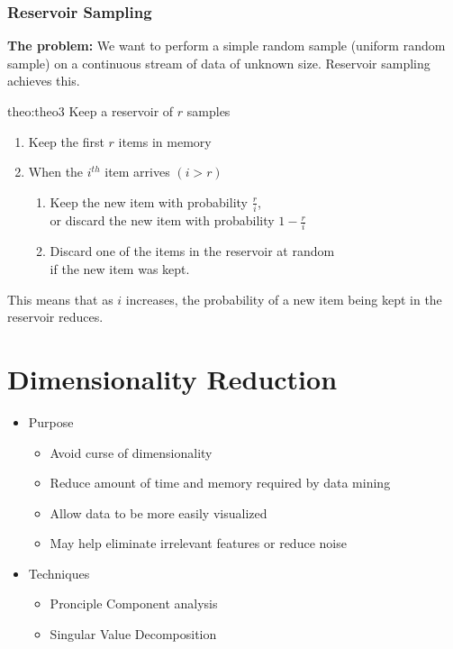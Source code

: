 \subsubsection{Reservoir Sampling}

\textbf{The problem:}
\medskip
We want to perform a simple random sample (uniform random sample) on a 
continuous stream of data of unknown size. Reservoir sampling achieves this.

\begin{theo}{theo:theo3}
    \label{eq:reservoir-sampling}
        Keep a reservoir of $r$ samples
        \begin{enumerate}
            \item Keep the first $r$ items in memory
            \item When the $i^{th}$ item arrives $(i>r)$
            \begin{enumerate}
                \item Keep the new item with probability $\frac{r}{i}$, \\
                or discard the new item with probability $1 - \frac{r}{i}$
                \item Discard one of the items in the reservoir at random \\
                if the new item was kept.
            \end{enumerate}
        \end{enumerate}

    This means that as $i$ increases, the probability of a new item being kept in the reservoir reduces.
\end{theo}

\section{Dimensionality Reduction}
\begin{itemize}
    \item Purpose
    \begin{itemize}
        \item Avoid curse of dimensionality
        \item Reduce amount of time and memory required by data mining
        \item Allow data to be more easily visualized
        \item May help eliminate irrelevant features or reduce noise
    \end{itemize}
    \item Techniques
    \begin{itemize}
        \item Pronciple Component analysis
        \item Singular Value Decomposition
    \end{itemize}
\end{itemize}
